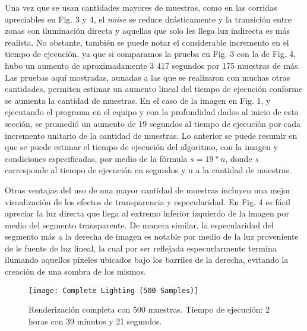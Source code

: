 \documentclass[conference]{IEEEtran}
\begin{document}
Una vez que se usan cantidades mayores de muestras, como en las corridas apreciables en Fig. 3 y 4, el \textit{noise} se reduce drásticamente y la transición entre zonas con iluminación directa y aquellas que solo les llega luz indirecta es más realista. No obstante, también se puede notar el considerable incremento en el tiempo de ejecución, ya que si comparamos la prueba en Fig. 3 con la de Fig. 4, hubo un aumento de aproximadamente 3 417 segundos por 175 muestras de más. Las pruebas aquí mostradas, aunadas a las que se realizaron con muchas otras cantidades, permiten estimar un aumento lineal del tiempo de ejecución conforme se aumenta la cantidad de muestras. En el caso de la imagen en Fig. 1, y ejecutando el programa en el equipo y con la profundidad dados al inicio de esta sección, se promedió un aumento de 19 segundos al tiempo de ejecución por cada incremento unitario de la cantidad de muestras. Lo anterior se puede resumir en que se puede estimar el tiempo de ejecución del algoritmo, con la imagen y condiciones especificadas, por medio de la fórmula \(s = 19 * n\), donde \textit{s} corresponde al tiempo de ejecución en segundos y n a la cantidad de muestras. 

Otras ventajas del uso de una mayor cantidad de muestras incluyen una mejor visualización de los efectos de transparencia y especularidad. En Fig. 4 es fácil apreciar la luz directa que llega al extremo inferior izquierdo de la imagen por medio del segmento transparente. De manera similar, la especularidad del segmento más a la derecha de imagen es notable por medio de la luz proveniente de le fuente de luz lineal, la cual por ser reflejada especurlarmente termina ilumando aquellos píxeles ubicados bajo los barriles de la derecha, evitando la creación de una sombra de los mismos.

\begin{figure}[htbp]
\centerline{\texttt{[image: Complete Lighting (500 Samples)]}}
\caption{Renderización completa con 500 muestras. Tiempo de ejecución: 2 horas con 39 minutos y 21 segundos.}
\label{500 muestras completo}
\end{figure}
\end{document}
